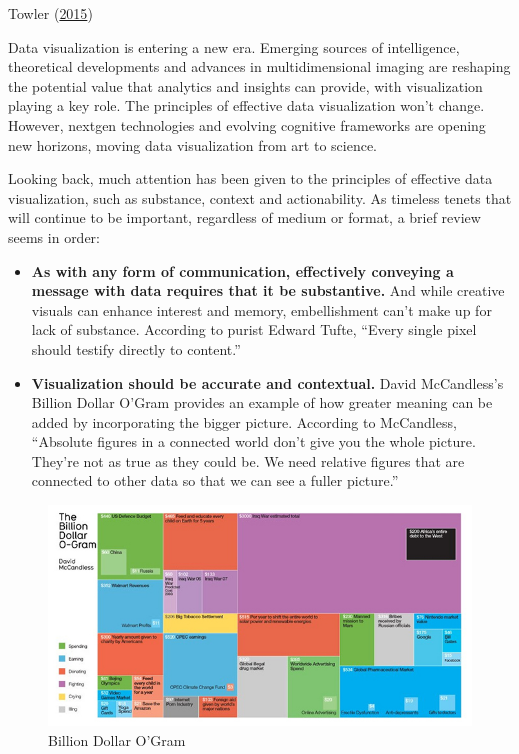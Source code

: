 \documentclass[]{book}
\theoremstyle{definition}
\theoremstyle{definition}
\theoremstyle{definition}
\theoremstyle{remark}
\begin{document}
Towler (\protect\hyperlink{ref-future_viz}{2015})

Data visualization is entering a new era. Emerging sources of
intelligence, theoretical developments and advances in multidimensional
imaging are reshaping the potential value that analytics and insights
can provide, with visualization playing a key role. The principles of
effective data visualization won't change. However, nextgen technologies
and evolving cognitive frameworks are opening new horizons, moving data
visualization from art to science.

Looking back, much attention has been given to the principles of
effective data visualization, such as substance, context and
actionability. As timeless tenets that will continue to be important,
regardless of medium or format, a brief review seems in order:

\begin{itemize}
\item
  \textbf{As with any form of communication, effectively conveying a
  message with data requires that it be substantive.} And while creative
  visuals can enhance interest and memory, embellishment can't make up
  for lack of substance. According to purist Edward Tufte, ``Every
  single pixel should testify directly to content.''
\item
  \textbf{Visualization should be accurate and contextual.} David
  McCandless's Billion Dollar O'Gram provides an example of how greater
  meaning can be added by incorporating the bigger picture. According to
  McCandless, ``Absolute figures in a connected world don't give you the
  whole picture. They're not as true as they could be. We need relative
  figures that are connected to other data so that we can see a fuller
  picture.''
\end{itemize}

\begin{figure}
\centering
\includegraphics{images/BillionDollar.jpg}
\caption{Billion Dollar O'Gram}
\end{figure}
\end{document}
